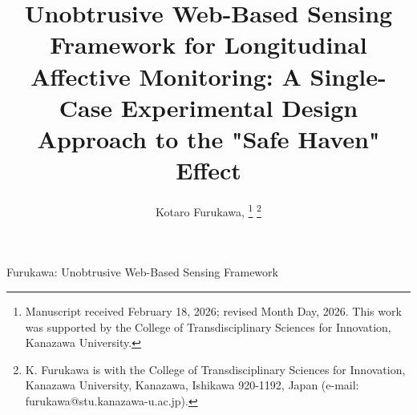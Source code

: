 \documentclass[journal]{IEEEtran}
\begin{document}
\title{Unobtrusive Web-Based Sensing Framework for Longitudinal Affective Monitoring: A Single-Case Experimental Design Approach to the "Safe Haven" Effect}

\author{Kotaro Furukawa, 
\thanks{Manuscript received February 18, 2026; revised Month Day, 2026. This work was supported by the College of Transdisciplinary Sciences for Innovation, Kanazawa University.}
\thanks{K. Furukawa is with the College of Transdisciplinary Sciences for Innovation, Kanazawa University, Kanazawa, Ishikawa 920-1192, Japan (e-mail: furukawa@stu.kanazawa-u.ac.jp).}}

%
{Furukawa: Unobtrusive Web-Based Sensing Framework}

\maketitle
\end{document}
